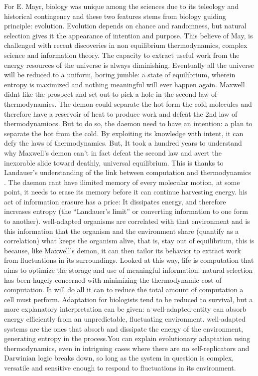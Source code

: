 \documentclass[onecollarge,runningheads]{svjour2}
\begin{document}
For E. Mayr, biology was unique among the sciences due to its teleology and historical contingency and these two features stems from biology guiding principle: evolution.  Evolution depends on chance and randomness, but natural selection gives it the appearance of intention and purpose. This believe of May, is challenged with recent discoveries in non equilibrium thermodynamics, complex science and information theory.
The capacity to extract useful work from the energy resources of the universe is always diminishing. Eventually all the universe will be reduced to a uniform, boring jumble: a state of equilibrium, wherein entropy is maximized and nothing meaningful will ever happen again. Maxwell didnt like the prospect and set out to pick a hole in the second law of thermodynamics. The demon could separate the hot form the cold molecules and therefore have a reservoir of heat to produce work and defeat the 2nd law of thermodynamiocs. But to do so, the daemon need to have an intention: a plan to separate the hot from the cold. By exploiting its knowledge with intent, it can defy the laws of thermodynamics. But, It took a hundred years to understand why Maxwell’s demon can’t in fact defeat the second law and avert the inexorable slide toward deathly, universal equilibrium. This is thanks to Landauer's understanding of the link between computation and thermodynamics . The daemon cant have ilimited memory of every molecular motion, at some point, it needs to erase its memory before it can continue harvesting energy. his act of information erasure has a price: It dissipates energy, and therefore increases entropy (the “Landauer’s limit” or converting information to one form to another).
well-adapted organisms are correlated with that environment and is this information that the organism and the environment share (quantify as a correlation) what keeps the organism alive, that is, stay out of equilibrium, this is because, like Maxwell’s demon, it can then tailor its behavior to extract work from fluctuations in its surroundings.
Looked at this way, life is computation that aims to optimize the storage and use of meaningful information.
natural selection has been hugely concerned with minimizing the thermodynamic cost of computation. It will do all it can to reduce the total amount of computation a cell must perform.
Adaptation for biologists tend to be reduced to survival, but a more explanatory interpretation can be given: a well-adapted entity can absorb energy efficiently from an unpredictable, fluctuating environment. well-adapted systems are the ones that absorb and dissipate the energy of the environment, generating entropy in the process.You can explain evolutionary adaptation using thermodynamics, even in intriguing cases where there are no self-replicators and Darwinian logic breaks down, so long as the system in question is complex, versatile and sensitive enough to respond to fluctuations in its environment.
\end{document}
